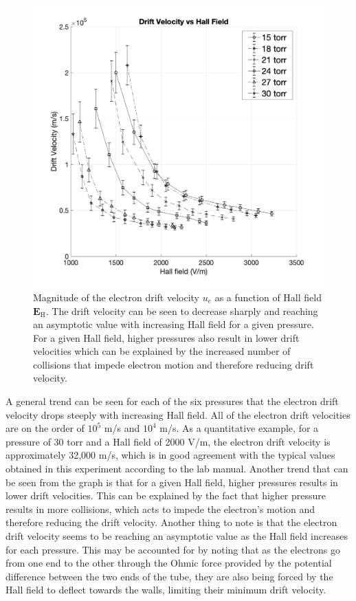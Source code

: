 \documentclass[%
 aip,
rsi,%
 amsmath,amssymb,
 reprint,%
author-numerical,%
]{revtex4-1}
\begin{document}
\begin{figure}
\includegraphics[width=1\linewidth]{lateximages/driftvelocity.png} 
\caption{\label{fig:driftvelocity} Magnitude of the electron drift velocity $u _ { e }$ as a function of Hall field $\boldsymbol { E } _ { \mathrm { H } }$. The drift velocity can be seen to decrease sharply and reaching an asymptotic value with increasing Hall field for a given pressure. For a given Hall field, higher pressures also result in lower drift velocities which can be explained by the increased number of collisions that impede electron motion and therefore reducing drift velocity.}
\end{figure}
A general trend can be seen for each of the six pressures that the electron drift velocity drops steeply with increasing Hall field. All of the electron drift velocities are on the order of $10^5$ m/s and $10^4$ m/s. As a quantitative example, for a pressure of 30 torr and a Hall field of 2000 V/m, the electron drift velocity is approximately 32,000 m/s, which is in good agreement with the typical values obtained in this experiment according to the lab manual. Another trend that can be seen from the graph is that for a given Hall field, higher pressures results in lower drift velocities. This can be explained by the fact that higher pressure results in more collisions, which acts to impede the electron's motion and therefore reducing the drift velocity. \newline
\indent Another thing to note is that the electron drift velocity seems to be reaching an asymptotic value as the Hall field increases for each pressure. This may be accounted for by noting that as the electrons go from one end to the other through the Ohmic force provided by the potential difference between the two ends of the tube, they are also being forced by the Hall field to deflect towards the walls, limiting their minimum drift velocity.
\end{document}
